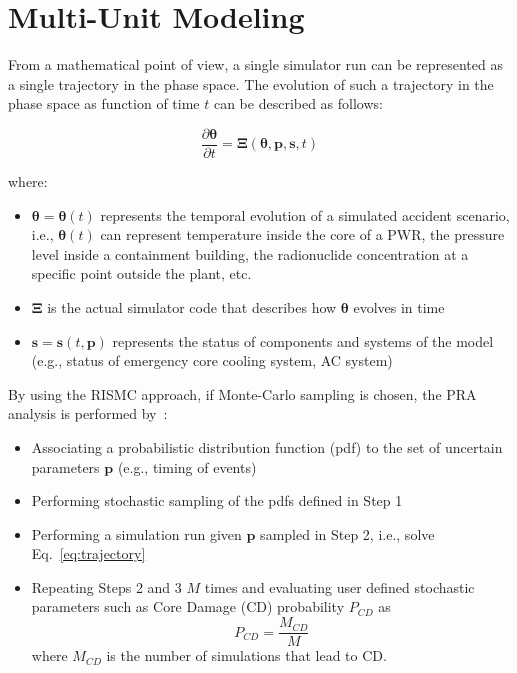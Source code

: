 \section{Multi-Unit Modeling}
\label{sec:multiUnitModeling}

From a mathematical point of view, a single simulator run can be represented 
as a single trajectory in the phase space. The evolution of such a trajectory 
in the phase space as function of time $t$ can be described as follows:

\begin{equation}
    \frac{\partial \boldsymbol \theta }{\partial t}  = \boldsymbol \Xi (\boldsymbol \theta , \boldsymbol p, \boldsymbol s , t) 
    \label{eq:trajectory}
\end{equation}

where:
\begin{itemize}
  \item $\boldsymbol \theta = \boldsymbol \theta(t)$ represents the temporal 
        evolution of a simulated accident scenario, i.e., $\boldsymbol \theta(t)$ can 
        represent temperature inside the core of a PWR, the pressure level inside a containment
        building, the radionuclide concentration at a specific point outside the plant, etc.
  \item $\boldsymbol \Xi$ is the actual simulator code that describes how $\boldsymbol \theta$ 
        evolves in time
  \item $\boldsymbol s = \boldsymbol s(t,\boldsymbol p)$ represents the status of components 
        and systems of the model (e.g., status of emergency core cooling system, AC system)
\end{itemize}

By using the RISMC approach, if Monte-Carlo sampling is chosen, the PRA analysis is performed 
by~\cite{BWR_SBO_Mandelli}:
\begin{itemize}
  \item Associating a probabilistic distribution function (pdf) to the set of uncertain 
        parameters $\boldsymbol p$ (e.g., timing of events)
  \item Performing stochastic sampling of the pdfs defined in Step 1
  \item Performing a simulation run given $\boldsymbol p$ sampled in Step 2, i.e., solve Eq.~\ref{eq:trajectory}
  \item Repeating Steps 2 and 3 $M$ times and evaluating user defined stochastic parameters such as 
        Core Damage (CD) probability $P_{CD}$ as
        \begin{equation}
            P_{CD} = \frac{M_{CD}}{M} 
            \label{eq:CDprobability}
        \end{equation}
        where $M_{CD}$ is the number of simulations that lead to CD. 
\end{itemize}

